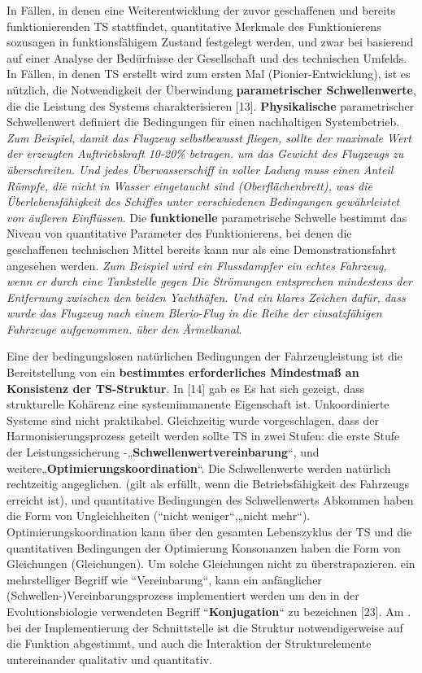 \documentclass[11pt,a4paper]{article}
\begin{document}
In Fällen, in denen eine Weiterentwicklung der zuvor geschaffenen und bereits
funktionierenden TS stattfindet, quantitative Merkmale des Funktionierens
sozusagen in funktionsfähigem Zustand festgelegt werden, und zwar bei
basierend auf einer Analyse der Bedürfnisse der Gesellschaft und des
technischen Umfelds. In Fällen, in denen TS erstellt wird zum ersten Mal
(Pionier-Entwicklung), ist es nützlich, die Notwendigkeit der Überwindung
\textbf{parametrischer Schwellenwerte}, die die Leistung des Systems
charakterisieren [13]. \textbf{Physikalische} parametrischer Schwellenwert
definiert die Bedingungen für einen nachhaltigen Systembetrieb.  \emph{Zum
  Beispiel, damit das Flugzeug selbstbewusst fliegen, sollte der maximale Wert
  der erzeugten Auftriebskraft 10-20\% betragen.  um das Gewicht des Flugzeugs
  zu überschreiten. Und jedes Überwasserschiff in voller Ladung muss einen
  Anteil Rümpfe, die nicht in Wasser eingetaucht sind (Oberflächenbrett), was
  die Überlebensfähigkeit des Schiffes unter verschiedenen Bedingungen
  gewährleistet von äußeren Einflüssen}. Die \textbf{funktionelle}
parametrische Schwelle bestimmt das Niveau von quantitative Parameter des
Funktionierens, bei denen die geschaffenen technischen Mittel bereits kann nur
als eine Demonstrationsfahrt angesehen werden. \emph{Zum Beispiel wird ein
  Flussdampfer ein echtes Fahrzeug, wenn er durch eine Tankstelle gegen Die
  Strömungen entsprechen mindestens der Entfernung zwischen den beiden
  Yachthäfen. Und ein klares Zeichen dafür, dass wurde das Flugzeug nach einem
  Blerio-Flug in die Reihe der einsatzfähigen Fahrzeuge aufgenommen.  über den
  Ärmelkanal}.

Eine der bedingungslosen natürlichen Bedingungen der Fahrzeugleistung ist die
Bereitstellung von ein \textbf{bestimmtes erforderliches Mindestmaß an
  Konsistenz der TS-Struktur}. In [14] gab es Es hat sich gezeigt, dass
strukturelle Kohärenz eine systemimmanente Eigenschaft ist.  Unkoordinierte
Systeme sind nicht praktikabel. Gleichzeitig wurde vorgeschlagen, dass der
Harmonisierungsprozess geteilt werden sollte TS in zwei Stufen: die erste
Stufe der Leistungssicherung -„\textbf{Schwellenwertvereinbarung}“, und
weitere„\textbf{Optimierungskoordination}“. Die Schwellenwerte werden
natürlich rechtzeitig angeglichen.  (gilt als erfüllt, wenn die
Betriebsfähigkeit des Fahrzeugs erreicht ist), und quantitative Bedingungen
des Schwellenwerts Abkommen haben die Form von Ungleichheiten (“nicht
weniger“,„nicht mehr“). Optimierungskoordination kann über den gesamten
Lebenszyklus der TS und die quantitativen Bedingungen der Optimierung
Konsonanzen haben die Form von Gleichungen (Gleichungen). Um solche
Gleichungen nicht zu überstrapazieren.  ein mehrstelliger Begriff wie
“Vereinbarung“, kann ein anfänglicher (Schwellen-)Vereinbarungsprozess
implementiert werden um den in der Evolutionsbiologie verwendeten Begriff
“\textbf{Konjugation}“ zu bezeichnen [23]. Am .  bei der Implementierung der
Schnittstelle ist die Struktur notwendigerweise auf die Funktion abgestimmt,
und auch die Interaktion der Strukturelemente untereinander qualitativ und
quantitativ.
\end{document}
